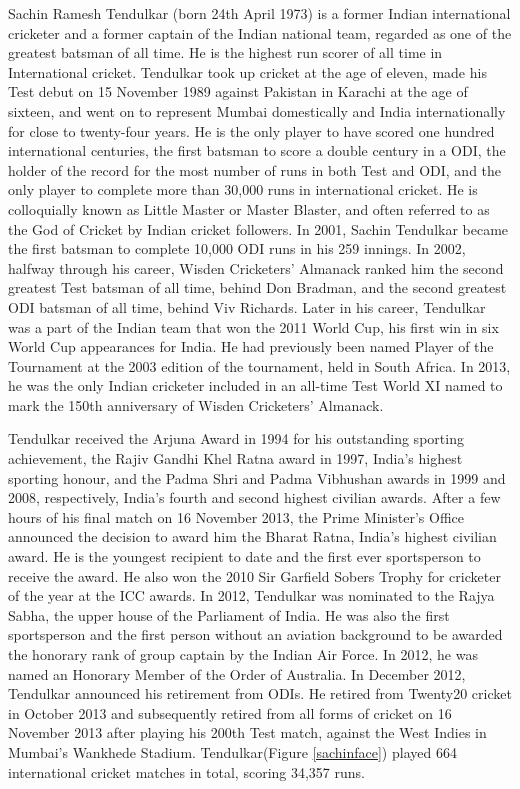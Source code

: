 \documentclass{report}
\begin{document}
Sachin Ramesh Tendulkar (born 24th April 1973) is a former Indian international cricketer and a former captain of the Indian national team, regarded as one of the greatest batsman of all time. He is the highest run scorer of all time in International cricket. Tendulkar took up cricket at the age of eleven, made his Test debut on 15 November 1989 against Pakistan in Karachi at the age of sixteen, and went on to represent Mumbai domestically and India internationally for close to twenty-four years. He is the only player to have scored one hundred international centuries, the first batsman to score a double century in a ODI, the holder of the record for the most number of runs in both Test and ODI, and the only player to complete more than 30,000 runs in international cricket. He is colloquially known as Little Master or Master Blaster, and often referred to as the God of Cricket by Indian cricket followers. In 2001, Sachin Tendulkar became the first batsman to complete 10,000 ODI runs in his 259 innings. In 2002, halfway through his career, Wisden Cricketers' Almanack ranked him the second greatest Test batsman of all time, behind Don Bradman, and the second greatest ODI batsman of all time, behind Viv Richards. Later in his career, Tendulkar was a part of the Indian team that won the 2011 World Cup, his first win in six World Cup appearances for India. He had previously been named Player of the Tournament at the 2003 edition of the tournament, held in South Africa. In 2013, he was the only Indian cricketer included in an all-time Test World XI named to mark the 150th anniversary of Wisden Cricketers' Almanack. 

Tendulkar received the Arjuna Award in 1994 for his outstanding sporting achievement, the Rajiv Gandhi Khel Ratna award in 1997, India's highest sporting honour, and the Padma Shri and Padma Vibhushan awards in 1999 and 2008, respectively, India's fourth and second highest civilian awards. After a few hours of his final match on 16 November 2013, the Prime Minister's Office announced the decision to award him the Bharat Ratna, India's highest civilian award. He is the youngest recipient to date and the first ever sportsperson to receive the award. He also won the 2010 Sir Garfield Sobers Trophy for cricketer of the year at the ICC awards. In 2012, Tendulkar was nominated to the Rajya Sabha, the upper house of the Parliament of India. He was also the first sportsperson and the first person without an aviation background to be awarded the honorary rank of group captain by the Indian Air Force. In 2012, he was named an Honorary Member of the Order of Australia.
\vspace{1cm}
In December 2012, Tendulkar announced his retirement from ODIs. He retired from Twenty20 cricket in October 2013 and subsequently retired from all forms of cricket on 16 November 2013 after playing his 200th Test match, against the West Indies in Mumbai's Wankhede Stadium. Tendulkar(Figure \ref{sachinface}) played 664 international cricket matches in total, scoring 34,357 runs.
\end{document}
